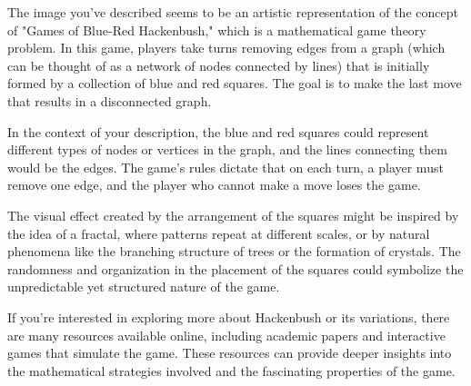 The image you've described seems to be an artistic representation of the concept of "Games of Blue-Red Hackenbush," which is a mathematical game theory problem. In this game, players take turns removing edges from a graph (which can be thought of as a network of nodes connected by lines) that is initially formed by a collection of blue and red squares. The goal is to make the last move that results in a disconnected graph.

In the context of your description, the blue and red squares could represent different types of nodes or vertices in the graph, and the lines connecting them would be the edges. The game's rules dictate that on each turn, a player must remove one edge, and the player who cannot make a move loses the game.

The visual effect created by the arrangement of the squares might be inspired by the idea of a fractal, where patterns repeat at different scales, or by natural phenomena like the branching structure of trees or the formation of crystals. The randomness and organization in the placement of the squares could symbolize the unpredictable yet structured nature of the game.

If you're interested in exploring more about Hackenbush or its variations, there are many resources available online, including academic papers and interactive games that simulate the game. These resources can provide deeper insights into the mathematical strategies involved and the fascinating properties of the game.